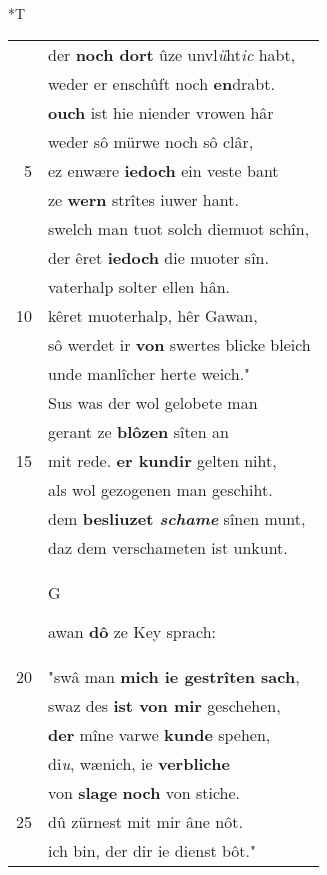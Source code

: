 \documentclass[8pt,a4paper,notitlepage]{article}
\begin{document}
\begin{table}[ht]
\begin{minipage}[t]{0.5\linewidth}
\end{minipage}
\hspace{0.5cm}
\begin{minipage}[t]{0.5\linewidth}
\small
\begin{center}*T
\end{center}
\begin{tabular}{rl}
 & der \textbf{noch dort} ûze unvl\textit{ü}ht\textit{ic} habt,\\ 
 & weder er enschûft noch \textbf{en}drabt.\\ 
 & \textbf{ouch} ist hie niender vrowen hâr\\ 
 & weder sô mürwe noch sô clâr,\\ 
5 & ez enwære \textbf{iedoch} ein veste bant\\ 
 & ze \textbf{wern} strîtes iuwer hant.\\ 
 & swelch man tuot solch diemuot schîn,\\ 
 & der êret \textbf{iedoch} die muoter sîn.\\ 
 & vaterhalp solter ellen hân.\\ 
10 & kêret muoterhalp, hêr Gawan,\\ 
 & sô werdet ir \textbf{von} swertes blicke bleich\\ 
 & unde manlîcher herte weich."\\ 
 & Sus was der wol gelobete man\\ 
 & gerant ze \textbf{blôzen} sîten an\\ 
15 & mit rede. \textbf{er kundir} gelten niht,\\ 
 & als wol gezogenen man geschiht.\\ 
 & dem \textbf{besliuzet \textit{schame}} sînen munt,\\ 
 & daz dem verschameten ist unkunt.\\ 
 & \begin{large}G\end{large}awan \textbf{dô} ze Key sprach:\\ 
20 & "swâ man \textbf{mich ie gestrîten sach},\\ 
 & swaz des \textbf{ist von mir} geschehen,\\ 
 & \textbf{der} mîne varwe \textbf{kunde} spehen,\\ 
 & di\textit{u}, wænich, ie \textbf{verbliche}\\ 
 & von \textbf{slage} \textbf{noch} von stiche.\\ 
25 & dû zürnest mit mir âne nôt.\\ 
 & ich bin, der dir ie dienst bôt."\\ 

\end{tabular}
\end{minipage}
\end{table}
\end{document}
